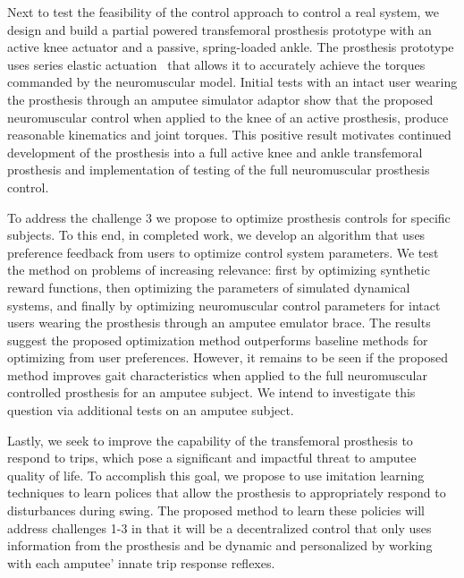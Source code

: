 Next to test the feasibility of the control approach to control a real system, we
design and build a partial powered transfemoral prosthesis prototype with an
active knee actuator and a passive, spring-loaded ankle. The prosthesis
prototype uses series elastic actuation~\citep{pratt1995series} that allows it
to accurately achieve the torques commanded by the neuromuscular model. Initial
tests with an intact user wearing the prosthesis through an amputee simulator
adaptor show that the proposed neuromuscular control when applied to the knee of
an active prosthesis, produce reasonable kinematics and joint torques. This
positive result motivates continued development of the prosthesis into a
full active knee and ankle transfemoral prosthesis and implementation of testing
of the full neuromuscular prosthesis control.

To address the challenge 3 we propose to optimize prosthesis controls for
specific subjects. To this end, in completed work, we develop an algorithm that
uses preference feedback from users to optimize control system parameters. We
test the method on problems of increasing relevance: first by optimizing
synthetic reward functions, then optimizing the parameters of simulated
dynamical systems, and finally by optimizing neuromuscular control parameters
for intact users wearing the prosthesis through an amputee emulator brace. The
results suggest the proposed optimization method outperforms baseline methods
for optimizing from user preferences. However, it remains to be seen if the
proposed method improves gait characteristics when applied to the full
neuromuscular controlled prosthesis for an amputee subject. We intend to
investigate this question via additional tests on an amputee subject.

Lastly, we seek to improve the capability of the transfemoral prosthesis to
respond to trips, which pose a significant and impactful threat to amputee
quality of life. To accomplish this goal, we propose to use imitation learning
techniques \citep{argall2009survey} to learn polices that allow the prosthesis
to appropriately respond to disturbances during swing.  The proposed method to
learn these policies will address challenges 1-3 in that it will be a
decentralized control that only uses information from the prosthesis and be
dynamic and personalized by working with each amputee' innate trip response
reflexes.

